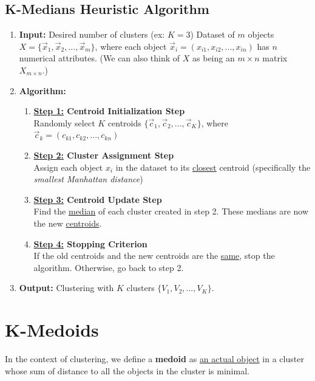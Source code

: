 \documentclass[11pt]{elegantbook}
\begin{document}
\subsection{K-Medians Heuristic Algorithm}
\begin{enumerate}
    \item \textbf{Input:}
    \subitem Desired number of clusters (ex: $K=3$)
    \subitem Dataset of $m$ objects $X=\{\vec{x}_1,\vec{x}_2,...,\vec{x}_m\}$, where each object $\vec{x}_i=(x_{i1},x_{i2},...,x_{in})$ has $n$ numerical attributes. (We can also think of $X$ as being an $m\times n$ matrix $X_{m\times n}$.)
    \item \textbf{Algorithm:}
    \begin{enumerate}[$\bullet$]
        \item \textbf{\underline{Step 1:} Centroid Initialization Step}\\
        Randomly select $K$ centroids $\{\vec{c}_1,\vec{c}_2,...,\vec{c}_K\}$, where $\vec{c}_k=(c_{k1},c_{k2},...,c_{kn})$
        \item \textbf{\underline{Step 2:} Cluster Assignment Step}\\
        Assign each object $x_i$ in the dataset to its \underline{closest} centroid (specifically the \textit{smallest Manhattan distance})
        \item \textbf{\underline{Step 3:} Centroid Update Step}\\
        Find the \underline{median} of each cluster created in step 2. These medians are now the new \underline{centroids}.
        \item \textbf{\underline{Step 4:} Stopping Criterion}\\
        If the old centroids and the new centroids are the \underline{same}, stop the algorithm. Otherwise, go back to step 2.
    \end{enumerate}
    \item \textbf{Output:} Clustering with $K$ clusters $\{V_1,V_2,...,V_K\}$.
\end{enumerate}


\section{K-Medoids}
\begin{definition}[Medoid]
    In the context of clustering, we define a \textbf{medoid} as \underline{an actual object} in a cluster whose sum of distance to all the objects in the cluster is minimal.
\end{definition}
\end{document}
